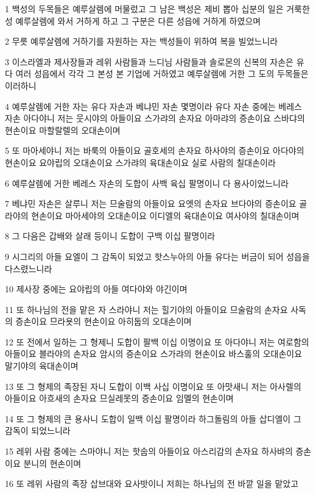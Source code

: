 \par 1 백성의 두목들은 예루살렘에 머물렀고 그 남은 백성은 제비 뽑아 십분의 일은 거룩한 성 예루살렘에 와서 거하게 하고 그 구분은 다른 성읍에 거하게 하였으며
\par 2 무릇 예루살렘에 거하기를 자원하는 자는 백성들이 위하여 복을 빌었느니라
\par 3 이스라엘과 제사장들과 레위 사람들과 느디님 사람들과 솔로몬의 신복의 자손은 유다 여러 성읍에서 각각 그 본성 본 기업에 거하였고 예루살렘에 거한 그 도의 두목들은 이러하니
\par 4 예루살렘에 거한 자는 유다 자손과 베냐민 자손 몇명이라 유다 자손 중에는 베레스 자손 아다야니 저는 웃시야의 아들이요 스가랴의 손자요 아마랴의 증손이요 스바댜의 현손이요 마할랄렐의 오대손이며
\par 5 또 마아세야니 저는 바룩의 아들이요 골호세의 손자요 하사야의 증손이요 아다야의 현손이요 요야립의 오대손이요 스가랴의 육대손이요 실로 사람의 칠대손이라
\par 6 예루살렘에 거한 베레스 자손의 도합이 사백 육십 팔명이니 다 용사이었느니라
\par 7 베냐민 자손은 살루니 저는 므술람의 아들이요 요엣의 손자요 브다야의 증손이요 골라야의 현손이요 마아세야의 오대손이요 이디엘의 육대손이요 여사야의 칠대손이며
\par 8 그 다음은 갑배와 살래 등이니 도합이 구백 이십 팔명이라
\par 9 시그리의 아들 요엘이 그 감독이 되었고 핫스누아의 아들 유다는 버금이 되어 성읍을 다스렸느니라
\par 10 제사장 중에는 요야립의 아들 여다야와 야긴이며
\par 11 또 하나님의 전을 맡은 자 스라야니 저는 힐기야의 아들이요 므술람의 손자요 사독의 증손이요 므라욧의 현손이요 아히둡의 오대손이며
\par 12 또 전에서 일하는 그 형제니 도합이 팔백 이십 이명이요 또 아다야니 저는 여로함의 아들이요 블라야의 손자요 암시의 증손이요 스가랴의 현손이요 바스훌의 오대손이요 말기야의 육대손이며
\par 13 또 그 형제의 족장된 자니 도합이 이백 사십 이명이요 또 아맛새니 저는 아사렐의 아들이요 아흐새의 손자요 므실레못의 증손이요 임멜의 현손이며
\par 14 또 그 형제의 큰 용사니 도합이 일백 이십 팔명이라 하그돌림의 아들 삽디엘이 그 감독이 되었느니라
\par 15 레위 사람 중에는 스마야니 저는 핫숩의 아들이요 아스리감의 손자요 하사뱌의 증손이요 분니의 현손이며
\par 16 또 레위 사람의 족장 삽브대와 요사밧이니 저희는 하나님의 전 바깥 일을 맡았고
